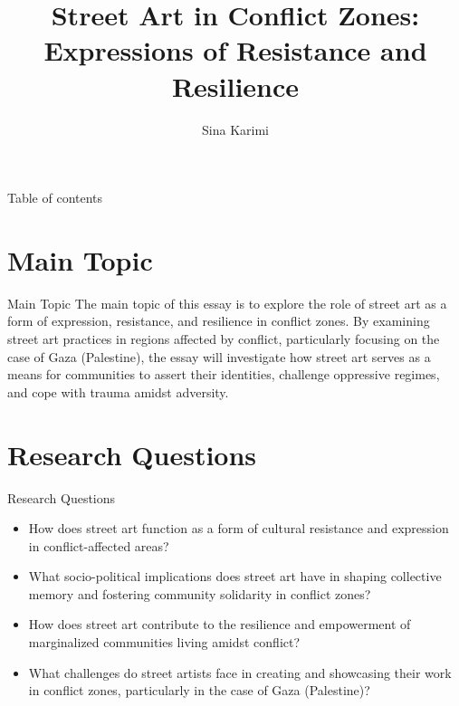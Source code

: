 \documentclass[10pt]{beamer}
\title{Street Art in Conflict Zones: Expressions of Resistance and Resilience}
\subtitle{}
\author{Sina Karimi}
\institute{Arth4340}
\date{}
\begin{document}
\maketitle

\begin{frame}{Table of contents}
  \tableofcontents
\end{frame}

\section{Main Topic}
\begin{frame}{Main Topic}
    The main topic of this essay is to explore the role of street art as a form of expression, resistance, and resilience in conflict zones. By examining street art practices in regions affected by conflict, particularly focusing on the case of Gaza (Palestine), the essay will investigate how street art serves as a means for communities to assert their identities, challenge oppressive regimes, and cope with trauma amidst adversity.
\end{frame}

\section{Research Questions}
\begin{frame}{Research Questions}
\begin{itemize}
    \item How does street art function as a form of cultural resistance and expression in conflict-affected areas?
    \item What socio-political implications does street art have in shaping collective memory and fostering community solidarity in conflict zones?
    \item How does street art contribute to the resilience and empowerment of marginalized communities living amidst conflict?
    \item What challenges do street artists face in creating and showcasing their work in conflict zones, particularly in the case of Gaza (Palestine)?
\end{itemize}
\end{frame}

\end{document}
